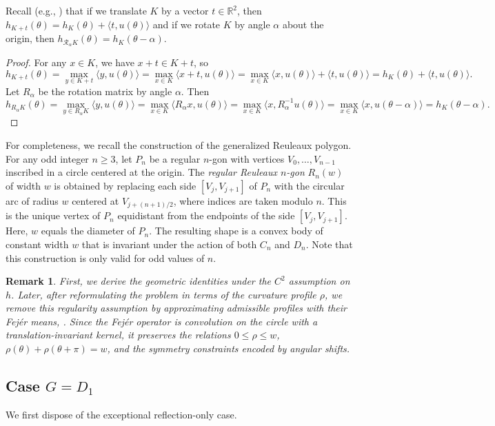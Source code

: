 \documentclass[11pt,letterpaper,reqno]{amsart}
\newcommand{\R}{\mathbb{R}}
\newcommand{\inner}[2]{\langle #1,#2\rangle}
\newtheorem{remark}[theorem]{Remark}
\providecommand{\R}{\mathbb{R}}
\begin{document}
Recall (e.g., \cite{Ga}) that if we translate $K$ by a vector $t\in\R^2$, then 
\(
h_{K+t}(\theta)=h_K(\theta)+\inner{t}{u(\theta)}
\)
and if we rotate $K$ by angle $\alpha$ about the origin, then
\(
h_{\mathcal R_\alpha K}(\theta)=h_K(\theta-\alpha).
\)


\begin{explanation}
    \begin{proof}
For any $x\in K$, we have $x+t\in K+t$, so
\[
h_{K+t}(\theta)=\max_{y\in K+t}\inner{y}{u(\theta)}=\max_{x\in K}\inner{x+t}{u(\theta)}=\max_{x\in K}\inner{x}{u(\theta)}+\inner{t}{u(\theta)}=h_K(\theta)+\inner{t}{u(\theta)}.
\]
Let $R_\alpha$ be the rotation matrix by angle $\alpha$. Then
\[
h_{R_\alpha K}(\theta)=\max_{y\in R_\alpha K}\inner{y}{u(\theta)}=\max_{x\in K}\inner{R_\alpha x}{u(\theta)}=\max_{x\in K}\inner{x}{R_\alpha^{-1}u(\theta)}=\max_{x\in K}\inner{x}{u(\theta-\alpha)}=h_K(\theta-\alpha).
\]
\end{proof}

For completeness, we recall the construction of the generalized Reuleaux polygon. For any odd integer \(n \geq 3\), let \(P_n\) be a regular \(n\)-gon with vertices \(V_0,\dots,V_{n-1}\) inscribed in a circle centered at the origin. The \emph{regular Reuleaux \(n\)-gon} \(R_n(w)\) of width \(w\) is obtained by replacing each side \([V_j,V_{j+1}]\) of \(P_n\) with the circular arc of radius \(w\) centered at \(V_{j+(n+1)/2}\), where indices are taken modulo \(n\). This is the unique vertex of \(P_n\) equidistant from the endpoints of the side \([V_j,V_{j+1}]\). Here, $w$ equals the diameter of $P_n$. The resulting shape is a convex body of constant width \(w\) that is invariant under the action of both \(C_n\) and \(D_n\). Note that this construction is only valid for odd values of \(n\).
\end{explanation}

\begin{remark}
    First, we derive the geometric identities under the $C^2$ assumption on $h$. Later, after reformulating the problem in terms of the curvature profile $\rho$, we remove this regularity assumption by approximating admissible profiles with their Fej\'er means, \cite{Edwards1}. Since the Fej\'er operator is convolution on the circle with a translation-invariant kernel, it preserves the relations $0\leq \rho\leq w$, $\rho(\theta)+\rho(\theta+\pi)=w$, and the symmetry constraints encoded by angular shifts.
\end{remark}


\subsection{Case $G=D_1$}
We first dispose of the exceptional reflection-only case.
\end{document}
